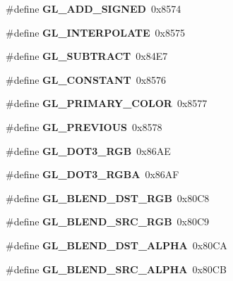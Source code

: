 \begin{DoxyCompactItemize}
\item 
\#define {\bfseries G\+L\+\_\+\+A\+D\+D\+\_\+\+S\+I\+G\+N\+E\+D}~0x8574\label{_s_d_l__opengl_8h_a312488560198574eb8fde9970fe26747}

\item 
\#define {\bfseries G\+L\+\_\+\+I\+N\+T\+E\+R\+P\+O\+L\+A\+T\+E}~0x8575\label{_s_d_l__opengl_8h_a8287eef1d8138f5cd1cd7cce1bc8e8b2}

\item 
\#define {\bfseries G\+L\+\_\+\+S\+U\+B\+T\+R\+A\+C\+T}~0x84\+E7\label{_s_d_l__opengl_8h_a181172fc9fc3ac2d3189ff966484ac09}

\item 
\#define {\bfseries G\+L\+\_\+\+C\+O\+N\+S\+T\+A\+N\+T}~0x8576\label{_s_d_l__opengl_8h_a85a64b02e8734c9e6e0b12d9a9578d5e}

\item 
\#define {\bfseries G\+L\+\_\+\+P\+R\+I\+M\+A\+R\+Y\+\_\+\+C\+O\+L\+O\+R}~0x8577\label{_s_d_l__opengl_8h_aa038438b64c1ddcc4f6a55a3212fc472}

\item 
\#define {\bfseries G\+L\+\_\+\+P\+R\+E\+V\+I\+O\+U\+S}~0x8578\label{_s_d_l__opengl_8h_ac36f5aadd8726da49cbaf146a56a544d}

\item 
\#define {\bfseries G\+L\+\_\+\+D\+O\+T3\+\_\+\+R\+G\+B}~0x86\+A\+E\label{_s_d_l__opengl_8h_ab1a90a0b6d5bde2a751b881202a53831}

\item 
\#define {\bfseries G\+L\+\_\+\+D\+O\+T3\+\_\+\+R\+G\+B\+A}~0x86\+A\+F\label{_s_d_l__opengl_8h_aa052e4a5d3f11f1cc0f058b05356a67f}

\item 
\#define {\bfseries G\+L\+\_\+\+B\+L\+E\+N\+D\+\_\+\+D\+S\+T\+\_\+\+R\+G\+B}~0x80\+C8\label{_s_d_l__opengl_8h_ac3979a3a4c982af6bc325e14ab943cd1}

\item 
\#define {\bfseries G\+L\+\_\+\+B\+L\+E\+N\+D\+\_\+\+S\+R\+C\+\_\+\+R\+G\+B}~0x80\+C9\label{_s_d_l__opengl_8h_aeb51171f8c89cddec550fba045e62651}

\item 
\#define {\bfseries G\+L\+\_\+\+B\+L\+E\+N\+D\+\_\+\+D\+S\+T\+\_\+\+A\+L\+P\+H\+A}~0x80\+C\+A\label{_s_d_l__opengl_8h_a1e8f20eb4f51cb2254e13789a19f48cd}

\item 
\#define {\bfseries G\+L\+\_\+\+B\+L\+E\+N\+D\+\_\+\+S\+R\+C\+\_\+\+A\+L\+P\+H\+A}~0x80\+C\+B\label{_s_d_l__opengl_8h_af2983dce40f413d43ca839abdeafd3ff}


\end{DoxyCompactItemize}
